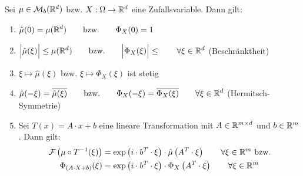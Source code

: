 \begin{theorem}\label{theorem6.1EigenschaftenDerFTCF}\enter
Sei $\mu\in\mathcal{M}_b(\mathbb{R}^d)$ bzw. $X:\Omega\to\mathbb{R}^d$ eine Zufallsvariable. Dann gilt:
\begin{enumerate}[label=(\alph*)]
\item $\begin{aligned}
\hat{\mu}(0)=\mu(\mathbb{R}^d)\qquad\text{bzw.}\qquad\Phi_X(0)=1
\end{aligned}$
\item $\begin{aligned}
\Big|\hat{\mu}(\xi)\Big|\leq\mu(\mathbb{R}^d)\qquad\text{bzw.}\qquad\Big|\Phi_X(\xi)\Big|\leq \qquad\forall\xi\in\mathbb{R}^d
\end{aligned}$ (Beschränktheit)
\item $\xi\mapsto\hat{\mu}(\xi)$ bzw. $\xi\mapsto\Phi_X(\xi)$ ist stetig
\item $\begin{aligned}
\hat{\mu}(-\xi)=\overline{\hat{\mu}(\xi)}\qquad\text{bzw.}\qquad\Phi_X(-\xi)=\overline{\Phi_X(\xi)}\qquad\forall\xi\in\mathbb{R}^d
\end{aligned}$ (Hermitsch-Symmetrie)
\item Sei $T(x)=A\cdot x+b$ eine lineare Transformation mit $A\in\mathbb{R}^{m\times d}$ und $b\in\mathbb{R}^m$. Dann gilt:
\begin{align*}
\mathcal{F}\left(\mu\circ T^{-1}(\xi)\right)&=\exp\left(i\cdot b^T\cdot\xi\right)\cdot\hat{\mu}\left(A^T\cdot\xi\right)\qquad\forall\xi\in\mathbb{R}^m\text{ bzw.}\\
\Phi_{(A\cdot X+b)}(\xi)
&=\exp\left(i\cdot b^T\cdot\xi\right)\cdot\Phi_X\left(A^T\cdot\xi\right)\qquad\forall\xi\in\mathbb{R}^m
\end{align*}
\end{enumerate}
\end{theorem}

